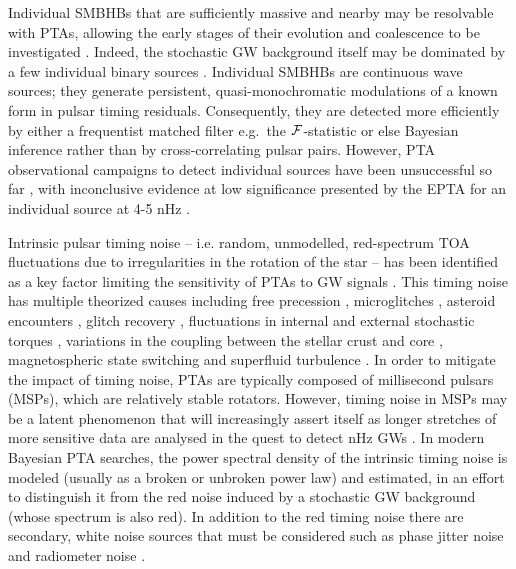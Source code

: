 \documentclass[fleqn,usenatbib,useAMS]{mnras}
\begin{document}
Individual SMBHBs that are sufficiently massive and nearby may be resolvable with PTAs, allowing the early stages of their evolution and coalescence to be investigated \citep{Sesana2010,Yardley2010,Zhu10,Babak2012,2013CQGra..30v4004E,Zhupulsarterms}. 
Indeed, the stochastic GW background itself may be dominated by a few individual binary sources \citep{Ravi2012singlesource}. Individual SMBHBs are continuous wave sources; they generate persistent, quasi-monochromatic modulations of a known form in pulsar timing residuals. Consequently, they are detected more efficiently by either a frequentist matched filter e.g.\ the ${\cal F}$-statistic \citep{Lee2011MNRAS.414.3251L, Ellis2012ApJ,Zhu2014PPTA} or else Bayesian inference \citep{Ellis2016,Arzoumanian2020A} rather than by cross-correlating pulsar pairs. However, PTA observational campaigns to detect individual sources have been unsuccessful so far \citep{Jenet2004,Zhu2014PPTA,Babak2016,Arzoumanian2023}, with inconclusive evidence at low significance presented by the EPTA for an individual source at 4-5 nHz \citep{2023arXiv230616226A}. \newline 


Intrinsic pulsar timing noise -- i.e.  random, unmodelled, red-spectrum TOA fluctuations due to irregularities in the rotation of the star -- has been identified as a key factor limiting the sensitivity of PTAs to GW signals \citep{Shannon2010,Lasky2015,Caballero2016,Goncharov2021}. This timing noise has multiple theorized causes including free precession \citep{free_precession_kerr,stairs_freeprecession}, microglitches \citep{Alessandro1995,Melatos2008,Espinoza2021}, asteroid encounters \citep{Shannon_2013,Brook_2014}, glitch recovery \citep{Johnston10,Hobbs2010glitch}, fluctuations in internal and external stochastic torques \citep{Cordes1981, 2006MNRAS.370L..76U,Antonelli2023}, variations in the coupling between the stellar crust and core \citep{Jones1990MNRAS.246..364J,Meyers2021,Melatos2023}, magnetospheric state switching \citep{magneto1,Lyne2010L,Stairs2019MNRAS.485.3230S} and superfluid turbulence \citep{Greenstein1970,Peralta2006,Melatos2014}. In order to mitigate the impact of timing noise, PTAs are typically composed of millisecond pulsars (MSPs), which are relatively stable rotators. However, timing noise in MSPs may be a latent phenomenon that will increasingly assert itself as longer stretches of more sensitive data are analysed in the quest to detect nHz GWs \citep{Shannon2010}. In modern Bayesian PTA searches, the power spectral density of the intrinsic timing noise is modeled (usually as a broken or unbroken power law) and estimated, in an effort to distinguish it from the red noise induced by a stochastic GW background (whose spectrum is also red). In addition to the red timing noise there are secondary, white noise sources that must be considered such as phase jitter noise and radiometer noise \citep{Cordes2010,Lam2019,Parthasarathy2021}. \newline 
\end{document}
